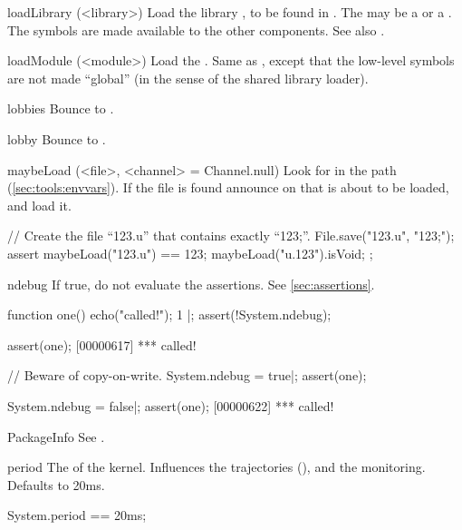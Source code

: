 \begin{urbiscriptapi}
\item[loadLibrary](<library>)%
  Load the library , to be found in
  .  The  may be a
   or a .  The \Cxx symbols are made
  available to the other \Cxx components.  See also .


\item[loadModule](<module>)%
  Load the \UObject {}.  Same as , except
  that the low-level \Cxx symbols are not made ``global'' (in the sense of
  the shared library loader).


\item[lobbies] Bounce to .


\item[lobby] Bounce to .


\item[maybeLoad](<file>, <channel> = Channel.null)%
  Look for  in the \urbi path (\autoref{sec:tools:envvars}).
  If the file is found announce on  that  is
  about to be loaded, and load it.

\begin{urbiscript}
// Create the file ``123.u'' that contains exactly ``123;''.
File.save("123.u", "123;");
assert
{
  maybeLoad("123.u") == 123;
  maybeLoad("u.123").isVoid;
};
\end{urbiscript}


\item[ndebug] If true, do not evaluate the assertions.  See
  \autoref{sec:assertions}.
\begin{urbiscript}
function one() { echo("called!"); 1 }|;
assert(!System.ndebug);

assert(one);
[00000617] *** called!

// Beware of copy-on-write.
System.ndebug = true|;
assert(one);

System.ndebug = false|;
assert(one);
[00000622] *** called!
\end{urbiscript}




\item[PackageInfo] See .


\item[period] The  of the \urbi kernel.  Influences the
  trajectories (), and the \UObject
  monitoring.  Defaults to 20ms.
\begin{urbiassert}
System.period == 20ms;
\end{urbiassert}



\end{urbiscriptapi}
